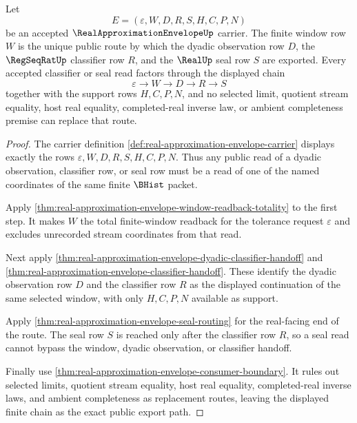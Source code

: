 \begin{theorem}
\label{thm:real-approximation-envelope-window-classifier-exactness}
Let
$$
E=(\varepsilon,W,D,R,S,H,C,P,N)
$$
be an accepted $\RealApproximationEnvelopeUp$ carrier. The finite window row $W$ is the unique public route by which the dyadic observation row $D$, the $\RegSeqRatUp$ classifier row $R$, and the $\RealUp$ seal row $S$ are exported. Every accepted classifier or seal read factors through the displayed chain
$$
\varepsilon \longrightarrow W \longrightarrow D \longrightarrow R \longrightarrow S
$$
together with the support rows $H,C,P,N$, and no selected limit, quotient stream equality, host real equality, completed-real inverse law, or ambient completeness premise can replace that route.
\end{theorem}
\begin{proof}
The carrier definition \autoref{def:real-approximation-envelope-carrier} displays exactly the rows $\varepsilon,W,D,R,S,H,C,P,N$. Thus any public read of a dyadic observation, classifier row, or seal row must be a read of one of the named coordinates of the same finite $\BHist$ packet.

Apply \autoref{thm:real-approximation-envelope-window-readback-totality} to the first step. It makes $W$ the total finite-window readback for the tolerance request $\varepsilon$ and excludes unrecorded stream coordinates from that read.

Next apply \autoref{thm:real-approximation-envelope-dyadic-classifier-handoff} and \autoref{thm:real-approximation-envelope-classifier-handoff}. These identify the dyadic observation row $D$ and the classifier row $R$ as the displayed continuation of the same selected window, with only $H,C,P,N$ available as support.

Apply \autoref{thm:real-approximation-envelope-seal-routing} for the real-facing end of the route. The seal row $S$ is reached only after the classifier row $R$, so a seal read cannot bypass the window, dyadic observation, or classifier handoff.

Finally use \autoref{thm:real-approximation-envelope-consumer-boundary}. It rules out selected limits, quotient stream equality, host real equality, completed-real inverse laws, and ambient completeness as replacement routes, leaving the displayed finite chain as the exact public export path.
\end{proof}

